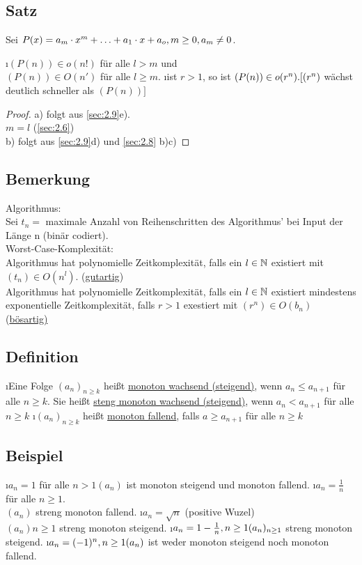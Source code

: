 \subsection[Satz: Landausymbole bei Polynomen]{Satz}
Sei $P(x) = a_m \cdot x^m + \ldots + a_1 \cdot x + a_o, m \geq 0, a_m \not = 0$.
\begin{enumerate}[a)]
\i $(P(n)) \in o(n!)$ für alle $l>m$ und\\
$(P(n)) \in O(n')$ für alle $l \geq m$.
\i ist $r > 1$, so ist $(P(n)) \in o(r^n).\\
\lbrack(r^n)$ wächst deutlich schneller als $(P(n))\rbrack$\\
\begin{proof}
a) folgt aus \ref{sec:2.9}e).\\
$m = l$ (\ref{sec:2.6})\\
b) folgt aus \ref{sec:2.9}d) und \ref{sec:2.8} b)c)
\end{proof}
\end{enumerate}
\subsection{Bemerkung}
Algorithmus:\\
Sei $t_n =$ maximale Anzahl von Reihenschritten des Algorithmus' bei Input der Länge n (binär codiert).\\
Worst-Case-Komplexität:\\
Algorithmus hat polynomielle Zeitkomplexität, falls ein $l \in \mathbb{N}$ existiert mit $(t_n) \in O(n^l)$. (\underline{gutartig})\\
Algorithmus hat polynomielle Zeitkomplexität, falls ein $l \in \mathbb{N}$ existiert mindestens exponentielle Zeitkomplexität, falls 
$ r > 1$ exestiert mit $(r^n) \in O(b_n)$ (\underline{bösartig)}
\subsection{Definition}\label{sec:2.18}
\begin{enumerate}[a)]
\i Eine Folge $(a_n)_{n \geq k}$ hei\ss t \underline{monoton wachsend (steigend)}, wenn $a_n \leq a_{n+1}$ f\"ur alle $n \geq k$. Sie hei\ss t \underline{steng monoton wachsend (steigend)}, wenn $a_n < a_{n+1}$ f\"ur alle $n \geq k$
\i $(a_n)_{n \geq k}$ hei\ss t \underline{monoton fallend}, falls $a \geq a_{n+1}$ f\"ur alle $n \geq k$
\end{enumerate}
\subsection{Beispiel}
\begin{enumerate}[a)]
\i $a_n = 1$ f\"ur alle $n > 1
(a_n)$ ist monoton steigend und monoton fallend.
\i $a_n = \frac{1}{n}$ f\"ur alle $n \geq 1$.\\
$(a_n)$ streng monoton fallend.
\i $a_n = \sqrt{n}$ (positive Wuzel)\\
$(a_n){n \geq 1}$ streng monoton steigend.
\i $a_n = 1 - \frac{1}{n}, n \geq 1\\
(a_n)_{n \geq 1}$ streng monoton steigend.
\i $a_n = (-1)^n, n \geq 1\\
(a_n)$ ist weder monoton steigend noch monoton fallend.
\end{enumerate}
